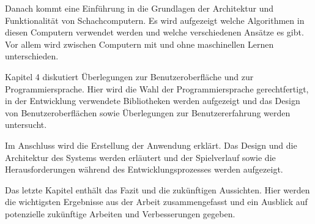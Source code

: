 Danach kommt eine Einführung in die Grundlagen der Architektur und Funktionalität von Schachcomputern.
Es wird aufgezeigt welche Algorithmen in diesen Computern verwendet werden und welche verschiedenen Ansätze es gibt.
Vor allem wird zwischen Computern mit und ohne maschinellen Lernen unterschieden.

Kapitel 4 diskutiert Überlegungen zur Benutzeroberfläche und zur Programmiersprache. Hier wird die Wahl der Programmiersprache gerechtfertigt, 
in der Entwicklung verwendete Bibliotheken werden aufgezeigt und das Design von Benutzeroberflächen sowie Überlegungen zur Benutzererfahrung werden untersucht. 

Im Anschluss wird die Erstellung der Anwendung erklärt. Das Design und die Architektur des Systems werden erläutert und der Spielverlauf sowie 
die Herausforderungen während des Entwicklungsprozesses werden aufgezeigt.

Das letzte Kapitel enthält das Fazit und die zukünftigen Aussichten. Hier werden die wichtigsten Ergebnisse aus der Arbeit 
zusammengefasst und ein Ausblick auf potenzielle zukünftige Arbeiten und Verbesserungen gegeben.